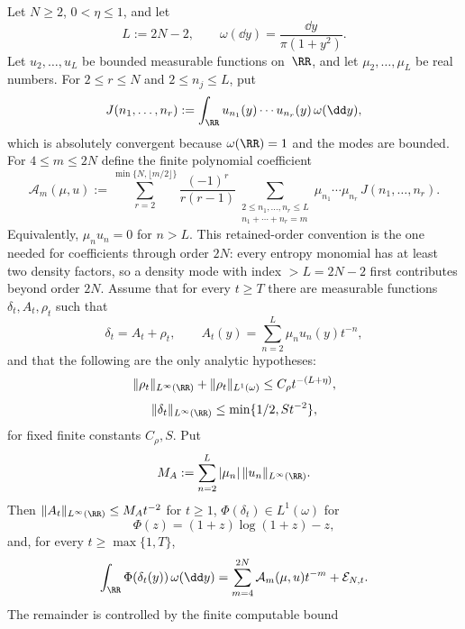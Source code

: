 \begin{proposition}%
\label{prop:density-to-entropy-descent}%
\label{lem:density-to-entropy-domination}%
\label{lem:explicit-entropy-constant-bound}
Let $N\ge2$, $0<\eta\le1$, and let
\[
L:=2N-2,\qquad
\omega(\dd y)=\frac{\dd y}{\pi(1+y^2)}.
\]
Let $u_2,\ldots,u_L$ be bounded measurable functions on~$\RR$, and let
$\mu_2,\ldots,\mu_L$ be real numbers.  For
$2\le r\le N$ and $2\le n_j\le L$, put
\[
J(n_1,\ldots,n_r)
:=\int_{\RR}u_{n_1}(y)\cdots u_{n_r}(y)\,\omega(\dd y),
\]
which is absolutely convergent because $\omega(\RR)=1$ and the modes are
bounded.  For $4\le m\le2N$ define the finite polynomial coefficient
\begin{equation}\label{eq:density-to-entropy-descent-coefficient}
\mathcal A_m(\mu,u)
:=
\sum_{r=2}^{\min\{N,\lfloor m/2\rfloor\}}
\frac{(-1)^r}{r(r-1)}
\sum_{\substack{2\le n_1,\ldots,n_r\le L\\
n_1+\cdots+n_r=m}}
\mu_{n_1}\cdots\mu_{n_r}\,J(n_1,\ldots,n_r).
\end{equation}
Equivalently, \(\mu_nu_n=0\) for \(n>L\).  This retained-order convention is
the one needed for coefficients through order \(2N\): every entropy monomial
has at least two density factors, so a density mode with index \(>L=2N-2\)
first contributes beyond order \(2N\).
Assume that for every $t\ge T$ there are measurable functions
$\delta_t,A_t,\rho_t$ such that
\begin{equation}\label{eq:density-to-entropy-descent-density}
\delta_t=A_t+\rho_t,\qquad
A_t(y)=\sum_{n=2}^{L}\mu_nu_n(y)t^{-n},
\end{equation}
and that the following are the only analytic hypotheses:
\begin{equation}\label{eq:density-to-entropy-descent-hypotheses}
\|\rho_t\|_{L^\infty(\RR)}+\|\rho_t\|_{L^1(\omega)}
\le C_\rho t^{-(L+\eta)},
\end{equation}
\[
\|\delta_t\|_{L^\infty(\RR)}\le\min\{1/2,S t^{-2}\},
\]
for fixed finite constants $C_\rho,S$.  Put
\[
M_A:=\sum_{n=2}^{L}|\mu_n|\,\|u_n\|_{L^\infty(\RR)} .
\]
Then $\|A_t\|_{L^\infty(\RR)}\le M_A t^{-2}$ for $t\ge1$,
$\Phi(\delta_t)\in L^1(\omega)$ for
\[
\Phi(z)=(1+z)\log(1+z)-z,
\]
and, for every $t\ge\max\{1,T\}$,
\begin{equation}\label{eq:density-to-entropy-descent-expansion}
\int_{\RR}\Phi(\delta_t(y))\,\omega(\dd y)
=\sum_{m=4}^{2N}\mathcal A_m(\mu,u)t^{-m}
+\mathcal E_{N,t}.
\end{equation}
The remainder is controlled by the finite computable bound

\end{proposition}
